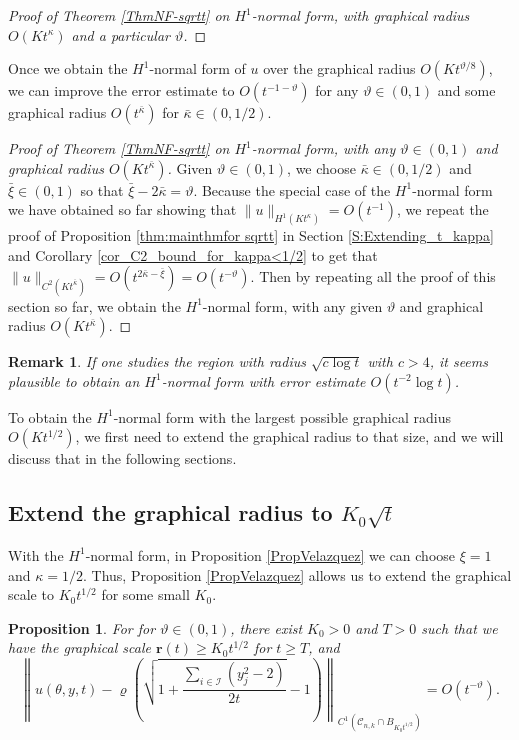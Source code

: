 \documentclass[11pt]{amsart}
\numberwithin{equation}{section}
\newtheorem{proposition}[theorem]{Proposition}
\newtheorem{remark}[theorem]{Remark}
\numberwithin{equation}{section}
\newcommand{\cC}{\mathcal{C}}
\newcommand{\cI}{\mathcal{I}}
\begin{document}
\begin{proof}[Proof of Theorem \ref{ThmNF-sqrtt} on $H^1$-normal form, with graphical radius $O(Kt^{\kappa})$ and a particular $\vartheta$]
	\end{proof}
	
	Once we obtain the $H^1$-normal form of $u$ over the graphical radius $O(Kt^{\vartheta/8})$, we can improve the error estimate to $O(t^{-1-\vartheta})$ for any $\vartheta\in(0,1)$ and some graphical radius $O(t^{\bar\kappa})$ for $\bar\kappa\in(0,1/2)$.
	
	\begin{proof}[Proof of Theorem \ref{ThmNF-sqrtt} on $H^1$-normal form, with any $\vartheta\in(0,1)$ and graphical radius $O(Kt^{\bar\kappa})$]
		Given $\vartheta\in(0,1)$, we choose $\bar\kappa\in(0,1/2)$ and $\bar\xi\in(0,1)$ so that $\bar\xi-2\bar\kappa=\vartheta$. Because the special case of the $H^1$-normal form we have obtained so far showing that $\|u\|_{H^1(Kt^{\kappa})}=O(t^{-1})$, we repeat the proof of Proposition \ref{thm:mainthmfor sqrtt} in Section \ref{S:Extending_t_kappa} and Corollary \ref{cor_C2_bound_for_kappa<1/2} to get that 
		$\|u\|_{C^2(Kt^{\bar\kappa})}=O(t^{2\bar\kappa-\bar\xi})=O(t^{-\vartheta})$. Then by repeating all the proof of this section so far, we obtain the $H^1$-normal form, with any given $\vartheta$ and graphical radius $O(Kt^{\bar\kappa})$.
	\end{proof}
	
	
	\begin{remark}\label{rmk_small_radius_better_H1}
		If one studies the region with radius $\sqrt{c\log t}$ with $c>4$, it seems plausible to obtain an $H^1$-normal form with error estimate $O(t^{-2}\log t)$.
	\end{remark}
	
	To obtain the $H^1$-normal form with the largest possible graphical radius $O(Kt^{1/2})$, we first need to extend the graphical radius to that size, and we will discuss that in the following sections.
	
	
	
	
	\subsection{Extend the graphical radius to $K_0\sqrt{t}$}\label{SS_Extend_Graphical_Radius_to_K_0t^1/2}
	With the $H^1$-normal form, in Proposition \ref{PropVelazquez} we can choose $\xi=1$ and $\kappa=1/2$. Thus, Proposition \ref{PropVelazquez} allows us to extend the graphical scale to  $K_0t^{1/2}$ for some small $K_0$. 
	
	\begin{proposition}\label{PropSmallSqrt}
		For for $\vartheta\in(0,1)$, there exist $K_0>0$ and $T>0$ such that we have the graphical scale $\mathbf{r}(t)\geq K_0t^{1/2}$ for $t\geq T$, and
		\[
		\left\|
		u(\theta,y,t)-\varrho\left(\sqrt{1+\frac{\sum_{i\in\cI}(y_j^2-2)}{2t}}-1\right)
		\right\|_{C^1(\cC_{n,k}\cap B_{K_0 t^{1/2}})}=O(t^{-\vartheta}).
		\]
	\end{proposition}
	
\end{document}
